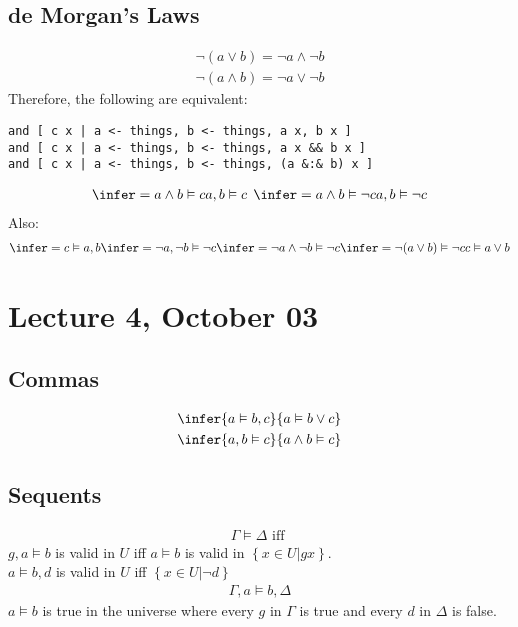 \documentclass{article}
\begin{document}
\subsection{de Morgan's Laws}
\begin{align}
    \neg (a \vee b) = \neg a \wedge \neg b\\
    \neg (a \wedge b) = \neg a \vee \neg b
\end{align}
Therefore, the following are equivalent:
\begin{verbatim}
and [ c x | a <- things, b <- things, a x, b x ]
and [ c x | a <- things, b <- things, a x && b x ]
and [ c x | a <- things, b <- things, (a &:& b) x ]
\end{verbatim}
\begin{align}
    \infer={a\wedge b \vDash c}{a, b \vDash c}\:\:
    \infer={a \wedge b \vDash \neg c}{a, b \vDash \neg c}
\end{align}
Also:
\begin{align}
    \infer={c\vDash a,b}{
        \infer={\neg a, \neg b \vDash \neg c}{
            \infer={\neg a \wedge \neg b \vDash \neg c}{
                \infer={\neg (a\vee b)\vDash \neg c}{
                    c\vDash a\vee b
                }
            }
        }
    }
\end{align}
\section{Lecture 4, October 03}
\subsection{Commas}
\begin{align}
    \infer{a\vDash b,c}{a \vDash b \vee c}\\
    \infer{a,b\vDash c}{a\wedge b\vDash c}
\end{align}
\subsection{Sequents}
\begin{align}
    \Gamma \vDash \Delta \text{ iff }
\end{align}
$g,a\vDash b$ is valid in $U$ iff $a\vDash b$ is valid in $\left\{x \in U | g x\right\}$.\\
$a\vDash b,d$ is valid in $U$ iff $\left\{x \in U | \neg d \right\}$\\
\begin{align}
    \Gamma, a \vDash b, \Delta
\end{align}
$a \vDash b$ is true in the universe where every $g$ in $\Gamma$ is true and every $d$ in $\Delta$ is false.
\end{document}
